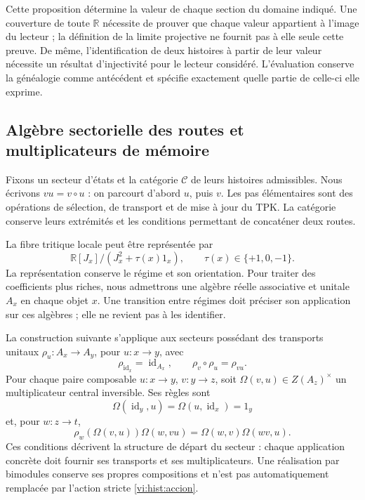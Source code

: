 Cette proposition détermine la valeur de chaque section du domaine indiqué.
Une couverture de toute \(\mathbb R\) nécessite de prouver que chaque valeur
appartient à l’image du lecteur ; la définition de la limite projective ne
fournit pas à elle seule cette preuve. De même, l’identification de deux
histoires à partir de leur valeur nécessite un résultat d’injectivité
pour le lecteur considéré. L’évaluation conserve la généalogie comme
antécédent et spécifie exactement quelle partie de celle-ci elle exprime.

\subsection{Algèbre sectorielle des routes et multiplicateurs de mémoire}
\label{vi:hist:algebra}

Fixons un secteur d’états et la catégorie \(\mathcal C\) de leurs
histoires admissibles. Nous écrivons \(vu=v\circ u\) : on parcourt d’abord
\(u\), puis \(v\). Les pas élémentaires sont des opérations de
sélection, de transport et de mise à jour du TPK. La catégorie conserve
leurs extrémités et les conditions permettant de concaténer deux routes.

La fibre tritique locale peut être représentée par
\[
 \mathbb R[J_x]/(J_x^2+\tau(x)1_x),
 \qquad \tau(x)\in\{+1,0,-1\}.
\]
La représentation conserve le régime et son orientation. Pour traiter
des coefficients plus riches, nous admettrons une algèbre réelle associative et
unitale \(A_x\) en chaque objet \(x\). Une transition entre régimes
doit préciser son application sur ces algèbres ; elle ne revient pas à les identifier.

La construction suivante s’applique aux secteurs possédant des transports
unitaux \(\rho_u:A_x\to A_y\), pour \(u:x\to y\), avec
\begin{equation}
 \rho_{\operatorname{id}_x}=\operatorname{id}_{A_x},\qquad
 \rho_v\circ\rho_u=\rho_{vu}.
 \label{vi:hist:accion}
\end{equation}
Pour chaque paire composable \(u:x\to y\), \(v:y\to z\), soit
\(\Omega(v,u)\in Z(A_z)^\times\) un multiplicateur central inversible.
Ses règles sont
\begin{equation}
 \Omega(\operatorname{id}_y,u)
 =\Omega(u,\operatorname{id}_x)=1_y
 \label{vi:hist:normalizacion}
\end{equation}
et, pour \(w:z\to t\),
\begin{equation}
 \rho_w\!\left(\Omega(v,u)\right)\Omega(w,vu)
 =\Omega(w,v)\Omega(wv,u).
 \label{vi:hist:cociclo}
\end{equation}
Ces conditions décrivent la structure de départ du secteur : chaque
application concrète doit fournir ses transports et ses multiplicateurs.
Une réalisation par bimodules conserve ses propres compositions et
n’est pas automatiquement remplacée par l’action stricte
\eqref{vi:hist:accion}.


